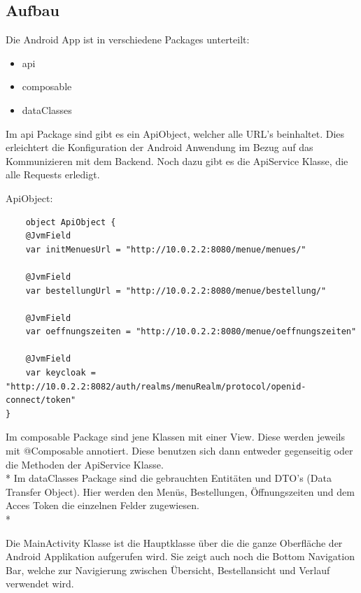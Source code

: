 \subsection{Aufbau}

Die Android App ist in verschiedene Packages unterteilt: 

\begin{itemize}
    \item api
    \item composable 
    \item dataClasses
\end{itemize}

Im api Package sind gibt es ein ApiObject, welcher alle URL's beinhaltet. Dies erleichtert die Konfiguration der Android Anwendung im Bezug auf das Kommunizieren mit dem Backend.
Noch dazu gibt es die ApiService Klasse, die alle Requests erledigt. 

ApiObject:
\begin{lstlisting}
    object ApiObject {
    @JvmField
    var initMenuesUrl = "http://10.0.2.2:8080/menue/menues/"

    @JvmField
    var bestellungUrl = "http://10.0.2.2:8080/menue/bestellung/"

    @JvmField
    var oeffnungszeiten = "http://10.0.2.2:8080/menue/oeffnungszeiten"

    @JvmField
    var keycloak = "http://10.0.2.2:8082/auth/realms/menuRealm/protocol/openid-connect/token"
}
\end{lstlisting}



Im composable Package sind jene Klassen mit einer View. Diese werden jeweils mit @Composable annotiert. Diese benutzen sich dann
entweder gegenseitig oder die Methoden der ApiService Klasse.
\\*
Im dataClasses Package sind die gebrauchten Entitäten und DTO's (Data Transfer Object).
Hier werden den Menüs, Bestellungen, Öffnungszeiten und dem Acces Token die einzelnen Felder zugewiesen.
\\*

Die MainActivity Klasse ist die Hauptklasse über die die ganze Oberfläche der Android Applikation aufgerufen wird. 
Sie zeigt auch noch die Bottom Navigation Bar, welche zur Navigierung zwischen Übersicht, Bestellansicht und Verlauf verwendet wird.







\pagebreak


